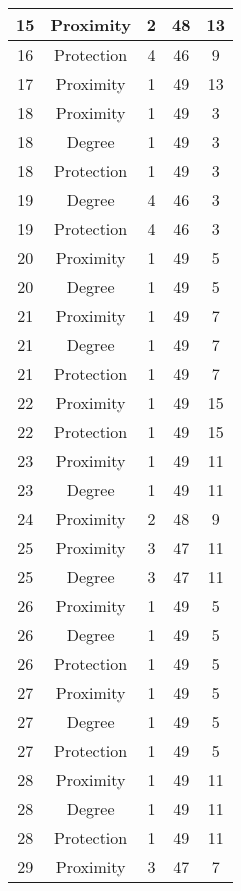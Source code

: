 \documentclass[results.tex]{subfiles}
\begin{document}
\begin{center}
\begin{tabular}{| c || c | c | c | c |}
    \hline
    15 & Proximity & 2 & 48 & 13 \\ 
    \hline
    16 & Protection & 4 & 46 & 9 \\ 
    \hline
    17 & Proximity & 1 & 49 & 13 \\ 
    \hline
    18 & Proximity & 1 & 49 & 3 \\ 
    \hline
    18 & Degree & 1 & 49 & 3 \\ 
    \hline
    18 & Protection & 1 & 49 & 3 \\ 
    \hline
    19 & Degree & 4 & 46 & 3 \\ 
    \hline
    19 & Protection & 4 & 46 & 3 \\ 
    \hline
    20 & Proximity & 1 & 49 & 5 \\ 
    \hline
    20 & Degree & 1 & 49 & 5 \\ 
    \hline
    21 & Proximity & 1 & 49 & 7 \\ 
    \hline
    21 & Degree & 1 & 49 & 7 \\ 
    \hline
    21 & Protection & 1 & 49 & 7 \\ 
    \hline
    22 & Proximity & 1 & 49 & 15 \\ 
    \hline
    22 & Protection & 1 & 49 & 15 \\ 
    \hline
    23 & Proximity & 1 & 49 & 11 \\ 
    \hline
    23 & Degree & 1 & 49 & 11 \\ 
    \hline
    24 & Proximity & 2 & 48 & 9 \\ 
    \hline
    25 & Proximity & 3 & 47 & 11 \\ 
    \hline
    25 & Degree & 3 & 47 & 11 \\ 
    \hline
    26 & Proximity & 1 & 49 & 5 \\ 
    \hline
    26 & Degree & 1 & 49 & 5 \\ 
    \hline
    26 & Protection & 1 & 49 & 5 \\ 
    \hline
    27 & Proximity & 1 & 49 & 5 \\ 
    \hline
    27 & Degree & 1 & 49 & 5 \\ 
    \hline
    27 & Protection & 1 & 49 & 5 \\ 
    \hline
    28 & Proximity & 1 & 49 & 11 \\ 
    \hline
    28 & Degree & 1 & 49 & 11 \\ 
    \hline
    28 & Protection & 1 & 49 & 11 \\ 
    \hline
    29 & Proximity & 3 & 47 & 7 \\ 

\end{tabular}
\end{center}
\end{document}
